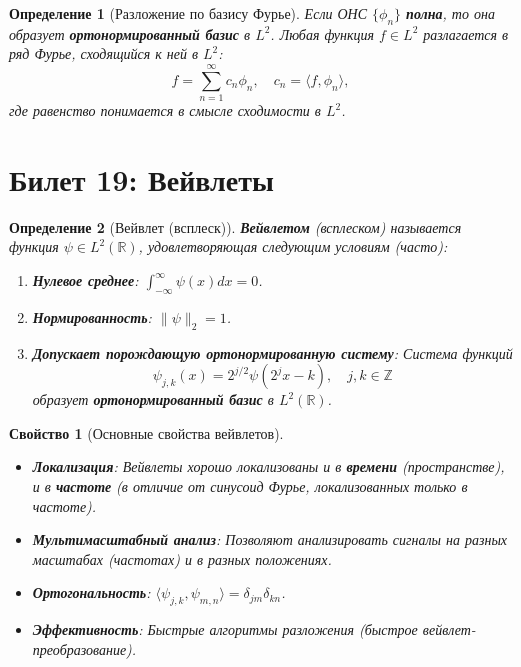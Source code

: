 \documentclass[a4paper, 12pt]{article}
\newtheorem{definition}{Определение}
\newtheorem{property}{Свойство}
\newcommand{\R}{\mathbb{R}}
\newcommand{\Z}{\mathbb{Z}}
\newcommand{\1}{\mathbf{1}}
\begin{document}
\begin{definition}[Разложение по базису Фурье]
    Если ОНС $\{\phi_n\}$ \textbf{полна}, то она образует \textbf{ортонормированный базис} в $L^2$. Любая функция $f \in L^2$ разлагается в ряд Фурье, сходящийся к ней в $L^2$:
    \[
    f = \sum_{n=1}^{\infty} c_n \phi_n, \quad c_n = \langle f, \phi_n \rangle,
    \]
    где равенство понимается в смысле сходимости в $L^2$.
\end{definition}

\section*{Билет 19: Вейвлеты}
\begin{definition}[Вейвлет (всплеск)]
    \textbf{Вейвлетом} (всплеском) называется функция $\psi \in L^2(\R)$, удовлетворяющая следующим условиям (часто):
    \begin{enumerate}[label=(\roman*)]
        \item \textbf{Нулевое среднее}: $\int_{-\infty}^{\infty} \psi(x)  dx = 0$.
        \item \textbf{Нормированность}: $\|\psi\|_2 = 1$.
        \item \textbf{Допускает порождающую ортонормированную систему}: Система функций
        \[
        \psi_{j,k}(x) = 2^{j/2} \psi(2^j x - k), \quad j,k \in \Z
        \]
        образует \textbf{ортонормированный базис} в $L^2(\R)$.
    \end{enumerate}
\end{definition}

\begin{property}[Основные свойства вейвлетов]
    \hfill
    \begin{itemize}
        \item \textbf{Локализация}: Вейвлеты хорошо локализованы и в \textbf{времени} (пространстве), и в \textbf{частоте} (в отличие от синусоид Фурье, локализованных только в частоте).
        \item \textbf{Мультимасштабный анализ}: Позволяют анализировать сигналы на разных масштабах (частотах) и в разных положениях.
        \item \textbf{Ортогональность}: $\langle \psi_{j,k}, \psi_{m,n} \rangle = \delta_{jm} \delta_{kn}$.
        \item \textbf{Эффективность}: Быстрые алгоритмы разложения (быстрое вейвлет-преобразование).
    \end{itemize}
\end{property}
\end{document}
